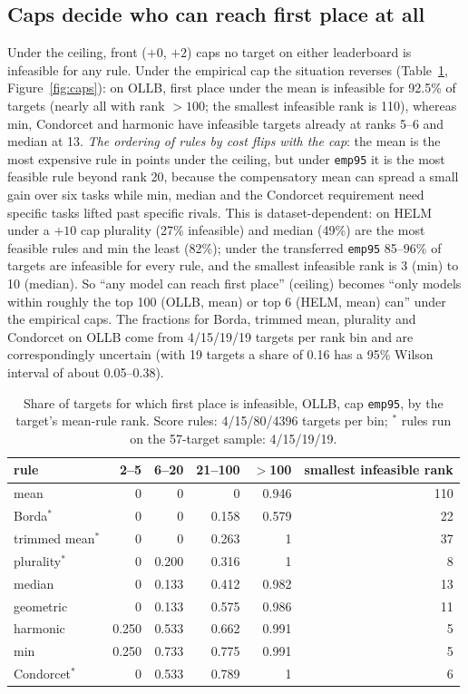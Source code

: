 \subsection{Caps decide who can reach first place at all}
\label{sec:exp-caps}
Under the ceiling, front ($+0$, $+2$) caps no target on either leaderboard is infeasible for any rule.
Under the empirical cap the situation reverses (Table~\ref{tab:feas}, Figure~\ref{fig:caps}): on OLLB, first place under the mean is infeasible for 92.5\% of targets (nearly all with rank $>100$; the smallest infeasible rank is 110), whereas min, Condorcet and harmonic have infeasible targets already at ranks 5--6 and median at 13.
\emph{The ordering of rules by cost flips with the cap}: the mean is the most expensive rule in points under the ceiling, but under \texttt{emp95} it is the most feasible rule beyond rank 20, because the compensatory mean can spread a small gain over six tasks while min, median and the Condorcet requirement need specific tasks lifted past specific rivals.
This is dataset-dependent: on HELM under a $+10$ cap plurality (27\% infeasible) and median (49\%) are the most feasible rules and min the least (82\%); under the transferred \texttt{emp95} 85--96\% of targets are infeasible for every rule, and the smallest infeasible rank is 3 (min) to 10 (median).
So ``any model can reach first place'' (ceiling) becomes ``only models within roughly the top 100 (OLLB, mean) or top 6 (HELM, mean) can'' under the empirical caps.
The fractions for Borda, trimmed mean, plurality and Condorcet on OLLB come from 4/15/19/19 targets per rank bin and are correspondingly uncertain (with 19 targets a share of 0.16 has a 95\% Wilson interval of about 0.05--0.38).

\begin{table}[t]
\caption{Share of targets for which first place is infeasible, OLLB, cap \texttt{emp95}, by the target's mean-rule rank. Score rules: 4/15/80/4396 targets per bin; $^\ast$ rules run on the 57-target sample: 4/15/19/19.}
\label{tab:feas}
\centering\small
\begin{tabular}{@{}lrrrrr@{}}
\toprule
rule & 2--5 & 6--20 & 21--100 & $>$100 & smallest infeasible rank \\
\midrule
mean & 0 & 0 & 0 & 0.946 & 110 \\
Borda$^\ast$ & 0 & 0 & 0.158 & 0.579 & 22 \\
trimmed mean$^\ast$ & 0 & 0 & 0.263 & 1 & 37 \\
plurality$^\ast$ & 0 & 0.200 & 0.316 & 1 & 8 \\
median & 0 & 0.133 & 0.412 & 0.982 & 13 \\
geometric & 0 & 0.133 & 0.575 & 0.986 & 11 \\
harmonic & 0.250 & 0.533 & 0.662 & 0.991 & 5 \\
min & 0.250 & 0.733 & 0.775 & 0.991 & 5 \\
Condorcet$^\ast$ & 0 & 0.533 & 0.789 & 1 & 6 \\
\bottomrule
\end{tabular}
\end{table}

